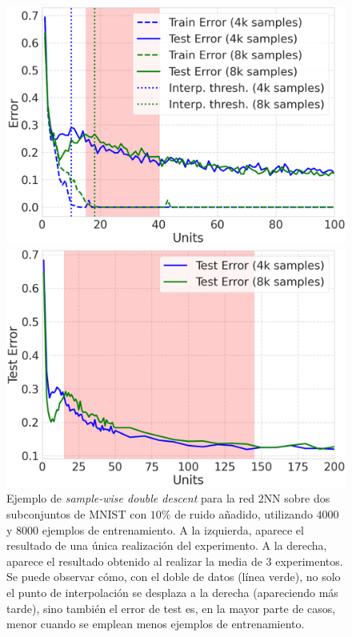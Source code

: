 \begin{figure}[h!]
    \centering
    \begin{minipage}{0.49\textwidth}
        \centering
        \includegraphics[width=\linewidth]{img/experiments/sample-wise-dd1.png}
    \end{minipage}
    \hfill
    \begin{minipage}{0.49\textwidth}
        \centering
        \includegraphics[width=\linewidth]{img/experiments/sample-wise-dd2.png}
    \end{minipage}
    \caption[Ejemplo de \textit{sample-wise double descent}.]{Ejemplo de \textit{sample-wise double descent} para la red $2$NN sobre dos subconjuntos de MNIST con $10\%$ de ruido añadido, utilizando $4000$ y $8000$ ejemplos de entrenamiento. A la izquierda, aparece el resultado de una única realización del experimento. A la derecha, aparece el resultado obtenido al realizar la media de $3$ experimentos. Se puede observar cómo, con el doble de datos (línea verde), no solo el punto de interpolación se desplaza a la derecha (apareciendo más tarde), sino también el error de test es, en la mayor parte de casos, menor cuando se emplean menos ejemplos de entrenamiento.}\label{fig:swdd}
\end{figure}

